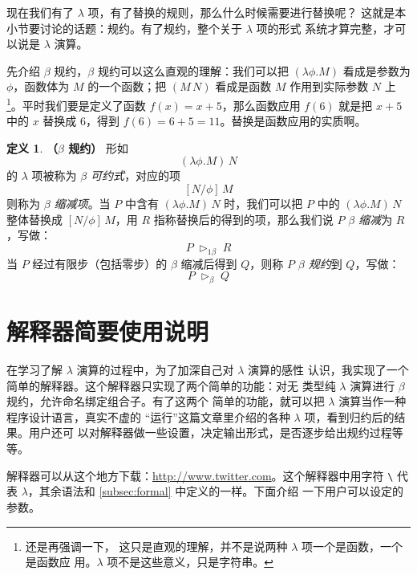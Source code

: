 \documentclass[a4paper,adobefonts]{ctexart}
\newcommand{\downloadurl}{\url{http://www.twitter.com}}
\theoremstyle{definition}
\newtheorem{definition}{定义}
\begin{document}
现在我们有了 $\lambda$ 项，有了替换的规则，那么什么时候需要进行替换呢？
这就是本小节要讨论的话题：规约。有了规约，整个关于 $\lambda$ 项的形式
系统才算完整，才可以说是 $\lambda$ 演算。

先介绍 $\beta$ 规约，$\beta$ 规约可以这么直观的理解：我们可以把
$(\lambda\phi.M)$ 看成是参数为 $\phi$，函数体为 $M$ 的一个函数；把
$(M\,N)$ 看成是函数 $M$ 作用到实际参数 $N$ 上\footnote{还是再强调一下，
  这只是直观的理解，并不是说两种 $\lambda$ 项一个是函数，一个是函数应
  用。$\lambda$ 项不是这些意义，只是字符串。}。平时我们要是定义了函数
$f(x)=x+5$，那么函数应用 $f(6)$ 就是把 $x+5$ 中的 $x$ 替换成 6，得到
$f(6)=6+5=11$。替换是函数应用的实质啊。

\begin{definition}{\bfseries{（$\beta$ 规约）}}
  形如
  $$
  (\lambda\phi.M)\,N
  $$
  的 $\lambda$ 项被称为 \emph{$\beta$ 可约式}，对应的项
  $$
  [N/\phi]\,M
  $$则称为 \emph{$\beta$ 缩减项}。当 $P$ 中含有 $(\lambda\phi.M)\,N$
  时，我们可以把 $P$ 中的 $(\lambda\phi.M)\,N$ 整体替换成
  $[N/\phi]\,M$，用 $R$ 指称替换后的得到的项，那么我们说 $P$
  \emph{$\beta$ 缩减}为 $R$，写做：
  $$
  P\;\triangleright_{1\beta}\;R
  $$当 $P$ 经过有限步（包括零步）的 $\beta$ 缩减后得到 $Q$，则称 $P$
  \emph{$\beta$ 规约}到 $Q$，写做：
  $$
  P\;\triangleright_\beta\;Q
  $$
\end{definition}

\newpage
\appendix
\section{解释器简要使用说明}\label{sec:interpreter}

在学习了解 $\lambda$ 演算的过程中，为了加深自己对 $\lambda$ 演算的感性
认识，我实现了一个简单的解释器。这个解释器只实现了两个简单的功能：对无
类型纯 $\lambda$ 演算进行 $\beta$ 规约，允许命名绑定组合子。有了这两个
简单的功能，就可以把 $\lambda$ 演算当作一种程序设计语言，真实不虚的
``运行''这篇文章里介绍的各种 $\lambda$ 项，看到归约后的结果。用户还可
以对解释器做一些设置，决定输出形式，是否逐步给出规约过程等等。

解释器可以从这个地方下载：\downloadurl。这个解释器中用字符 \verb|\|
代表 $\lambda$，其余语法和 \ref{subsec:formal} 中定义的一样。下面介绍
一下用户可以设定的参数。
\end{document}
